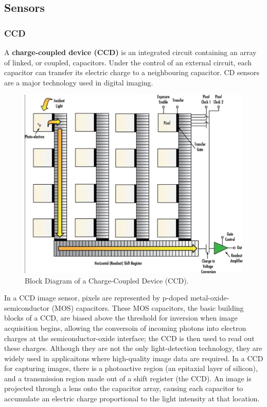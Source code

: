 \documentclass[10pt]{article}
\begin{document}
\begin{multicols}{2}
\subsection{Sensors}
\subsubsection{CCD}
A \textbf{charge-coupled device (CCD)} is an integrated circuit containing an array of linked, or coupled, capacitors. Under the control of an external circuit, each capacitor can transfer its electric charge to a neighbouring capacitor. CD sensors are a major technology used in digital imaging.
\begin{figure}[H]
    \centering
    \includegraphics[width=1\linewidth]{Images/Week 2/ccd-schematic.png}
    \caption{Block Diagram of a Charge-Coupled Device (CCD).}
\end{figure}
In a CCD image sensor, pixels are represented by p-doped metal-oxide-semiconductor (MOS) capacitors. These MOS capacitors, the basic building blocks of a CCD, are biased above the threshold for inversion when image acquisition begins, allowing the conversoin of incoming photons into electron charges at the semiconductor-oxide interface; the CCD is then used to read out these charges.
Although they are not the only light-detection technology, they are widely used in applicaitons where high-quality image data are required.
\newline \newline
In a CCD for capturing images, there is a photoactive region (an epitaxial layer of silicon), and a transmission region made out of a shift register (the CCD). An image is projected through a lens onto the capacitor array, causing each capacitor to accumulate an electric charge proportional to the light intensity at that location.

\end{multicols}
\end{document}

